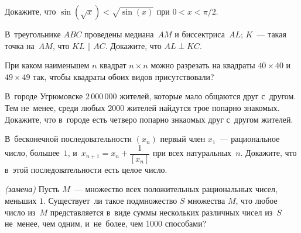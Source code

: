 

\begin{problems}

\item
Докажите, что $\sin(\sqrt{x}) < \sqrt{\sin(x)}$ при $0 < x < \pi / 2$.

\item
В~треугольнике $ABC$ проведены медиана~$AM$ и биссектриса~$AL$;
$K$~--- такая точка на~$AM$, что $KL \parallel AC$.
Докажите, что $AL \perp KC$.

\item
При каком наименьшем $n$ квадрат $n \times n$ можно разрезать на квадраты
$40 \times 40$ и $49 \times 49$ так, чтобы квадраты обоих видов присутствовали?

В~городе Угрюмовске 2\,000\,000 жителей, которые мало общаются друг с~другом.
Тем не~менее, среди любых 2000 жителей найдутся трое попарно знакомых.
Докажите, что в~городе есть четверо попарно знкаомых друг с~другом жителей.

\item
В~бесконечной последовательности $(x_n)$ первый член $x_1$~--- рациональное
число, большее~$1$, и~$x_{n+1} = x_n + \dfrac{1}{[x_n]}$ при всех
натуральных~$n$.
Докажите, что в~этой последовательности есть целое число.

 \emph{(замена)}
Пусть $M$~--- множество всех положительных рациональных чисел, меньших $1$.
Существует~ли такое подмножество $S$ множества $M$, что любое число из~$M$
представляется в~виде суммы нескольких различных чисел из~$S$ не~менее, чем
одним, и~не~более, чем $1000$ способами?

\end{problems}

